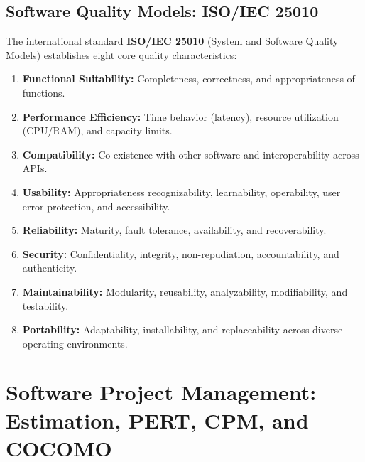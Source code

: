 \subsection{Software Quality Models: ISO/IEC 25010}
The international standard \textbf{ISO/IEC 25010} (System and Software Quality Models) establishes eight core quality characteristics:
\begin{enumerate}
    \item \textbf{Functional Suitability:} Completeness, correctness, and appropriateness of functions.
    \item \textbf{Performance Efficiency:} Time behavior (latency), resource utilization (CPU/RAM), and capacity limits.
    \item \textbf{Compatibility:} Co-existence with other software and interoperability across APIs.
    \item \textbf{Usability:} Appropriateness recognizability, learnability, operability, user error protection, and accessibility.
    \item \textbf{Reliability:} Maturity, fault tolerance, availability, and recoverability.
    \item \textbf{Security:} Confidentiality, integrity, non-repudiation, accountability, and authenticity.
    \item \textbf{Maintainability:} Modularity, reusability, analyzability, modifiability, and testability.
    \item \textbf{Portability:} Adaptability, installability, and replaceability across diverse operating environments.
\end{enumerate}



\section{Software Project Management: Estimation, PERT, CPM, and COCOMO}
\label{sec:se_project_management}

